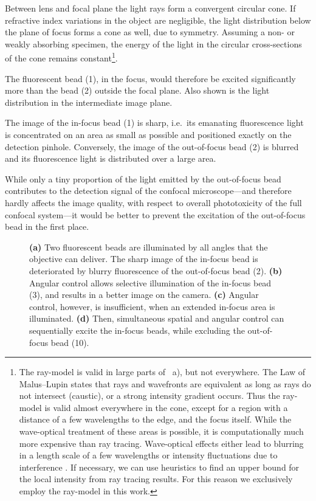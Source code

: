 Between lens and focal plane the light rays form a convergent circular
cone. If refractive index variations in the object are negligible, the
light distribution below the plane of focus forms a cone as well, due
to symmetry.  Assuming a non- or weakly absorbing specimen, the energy
of the light in the circular cross-sections of the cone remains
constant\footnote{The ray-model is valid in large parts of
~a), but not everywhere. The Law of
Malus--Lupin states that rays and wavefronts are equivalent as long as
rays do not intersect (caustic), or %
a strong
intensity gradient occurs. Thus the ray-model is valid almost
everywhere in the cone, except for a region with a distance of a few
wavelengths to the edge, and the focus itself. While the wave-optical
treatment of these areas is possible, it is computationally much more
expensive than ray tracing. Wave-optical effects either lead to
blurring in a length scale of a few wavelengths or intensity
fluctuations due to interference \citep{Stokseth1969}. If necessary, we can use heuristics
to find an upper bound for the local intensity from ray tracing
results. For this reason we exclusively employ the ray-model in this
work.}\label{sec:ray-valid}.


The fluorescent bead (1), in the focus, would therefore be excited
significantly more than the bead (2) outside the focal plane. Also
shown is the light distribution in the intermediate image plane.

The image of the in-focus bead (1) is sharp, i.e.\ its emanating  %
fluorescence light is concentrated on an area as small as possible and
positioned exactly on the detection pinhole. Conversely, the image of
the out-of-focus bead (2) is blurred and its fluorescence light is
distributed over a large area.

While only a tiny proportion of the light emitted by the out-of-focus
bead contributes to the detection signal of the confocal
microscope---and therefore hardly affects the image quality, with
respect to overall phototoxicity of the full confocal system---it
would be better to prevent the excitation of the out-of-focus bead in
the first place.

\begin{figure}[!hbt] \centering {}
  \caption{{\bf (a)} Two fluorescent beads are illuminated by all
angles that the objective can 
deliver. The sharp image of the in-focus bead is deteriorated by
blurry fluorescence of the out-of-focus bead (2). {\bf (b)} Angular
control allows selective illumination of the in-focus bead (3), and
results in a better image on the camera. {\bf (c)} Angular control,
however, is insufficient, when an extended in-focus area is
illuminated. {\bf (d)} Then, simultaneous spatial and angular control
can sequentially excite the in-focus beads, while excluding
the out-of-focus bead (10).}
  \label{fig:hourglass-all}
\end{figure}

